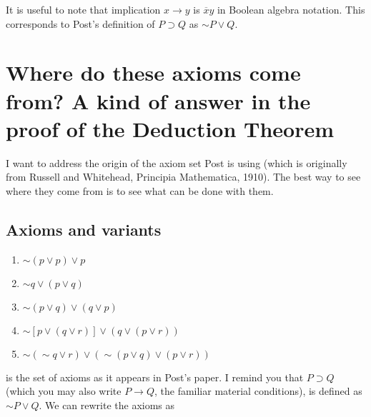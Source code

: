 \documentclass[12pt]{article}
\begin{document}
It is useful to note that implication $x \rightarrow y$ is $\overline xy$ in Boolean algebra notation.  This corresponds to Post's definition of $P \supset Q$ as
$\sim P \vee Q$.

\section{Where do these axioms come from?  A kind of answer in the proof of the Deduction Theorem}

I want to address the origin of the axiom set Post is using (which is originally from Russell and Whitehead, Principia Mathematica, 1910).  The best way to see where they come from is to see what can be done with them.

\subsection{Axioms and variants}

\begin{enumerate}

\item $\sim(p \vee p) \vee p$

\item $\sim q \vee (p \vee q)$

\item $\sim(p \vee q) \vee (q \vee p)$

\item $\sim[p \vee (q \vee r)] \vee (q \vee (p \vee r))$

\item $\sim(\sim q \vee r) \vee (\sim (p \vee q) \vee (p \vee r))$

\end{enumerate}

is the set of axioms as it appears in Post's paper.  I remind you that $P \supset Q$ (which you may also write $P \rightarrow Q$, the familiar material conditions), is
defined as $\sim P \vee Q$.  We can rewrite the axioms as
\end{document}
